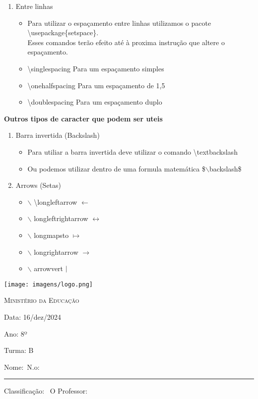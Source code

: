 \documentclass[11pt,a4paper]{article}
\begin{document}
\begin{enumerate}
\begin{enumerate}
\begin{itemize}
				\end{itemize}
			\item Entre linhas
				\begin{itemize}
					\item Para utilizar o espaçamento entre linhas utilizamos o pacote \textbackslash usepackage\{setspace\}. \\ Esses comandos terão efeito até à proxima instrução que altere o espaçamento.
					\item \textbackslash{}singlespacing Para um espaçamento simples
					\item \textbackslash{}onehalfspacing Para um espaçamento de 1,5
					\item \textbackslash{}doublespacing Para um espaçamento duplo
				
				\end{itemize}
		\end{enumerate}
\end{enumerate}

\Large \textbf{Outros tipos de caracter que podem ser uteis}\\ \normalsize
	\begin{enumerate}
		\item Barra invertida (Backslash)
		\begin{itemize}
			\item Para utiliar a barra invertida deve utilizar o comando \textbackslash textbackslash
			\item Ou podemos utilizar dentro de uma formula matemática \$$\backslash$backslash\$
		\end{itemize}
		\item Arrows (Setas)
		\begin{itemize}
			\item  $\backslash$ \textbackslash longleftarrow \quad $\longleftarrow$ 
			\item $\backslash$ longleftrightarrow \quad $\longleftrightarrow$
			\item $\backslash$ longmapsto \quad $\longmapsto$
			\item $\backslash$ longrightarrow \quad$\longrightarrow$
			\item $\backslash$ arrowvert \quad $\arrowvert$
		\end{itemize}
	
\end{enumerate}
	
\newpage

\begin{minipage}[c][1.5cm][c]{3.5cm}
\texttt{[image: imagens/logo.png]}
\end{minipage}
\begin{minipage}[c][1.5cm][c]{10cm}
	 \centering \textsc{Ministério da Educação}
\end{minipage}
\begin{minipage}[c][1.5cm][c]{5cm}
	Data: 16/dez/2024
	
	Ano: 8º
	
	Turma: B
\end{minipage}

\vspace{.5cm}

Nome:\hrulefill \, N.o: \rule{.5cm}{.1mm}
\vspace{1cm}

Classificação: \hrulefill \, O Professor: \hrulefill
\end{document}
